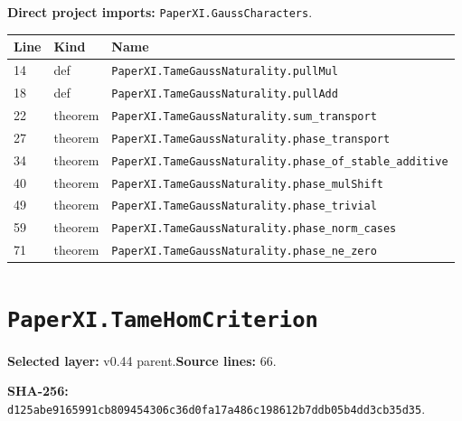 \documentclass[10pt,oneside]{book}
\begin{document}

\textbf{Direct project imports:} \nolinkurl{PaperXI.GaussCharacters}.

\begin{longtable}{@{}p{}p{}p{}@{}}\toprule Line&Kind&Name\\\midrule\endhead

14&def&\nolinkurl{PaperXI.TameGaussNaturality.pullMul}\\

18&def&\nolinkurl{PaperXI.TameGaussNaturality.pullAdd}\\

22&theorem&\nolinkurl{PaperXI.TameGaussNaturality.sum_transport}\\

27&theorem&\nolinkurl{PaperXI.TameGaussNaturality.phase_transport}\\

34&theorem&\nolinkurl{PaperXI.TameGaussNaturality.phase_of_stable_additive}\\

40&theorem&\nolinkurl{PaperXI.TameGaussNaturality.phase_mulShift}\\

49&theorem&\nolinkurl{PaperXI.TameGaussNaturality.phase_trivial}\\

59&theorem&\nolinkurl{PaperXI.TameGaussNaturality.phase_norm_cases}\\

71&theorem&\nolinkurl{PaperXI.TameGaussNaturality.phase_ne_zero}\\

\bottomrule\end{longtable}

\section{\texorpdfstring{\nolinkurl{PaperXI.TameHomCriterion}}{PaperXI.TameHomCriterion}}\label{module:PaperXI.TameHomCriterion}

\textbf{Selected layer:} v0.44 parent.\quad\textbf{Source lines:} 66.\par\textbf{SHA-256:} {\scriptsize\nolinkurl{d125abe9165991cb809454306c36d0fa17a486c198612b7ddb05b4dd3cb35d35}}.

\end{document}
